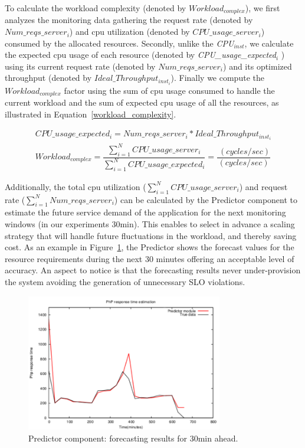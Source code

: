 To calculate the workload complexity (denoted by \emph{$Workload_{complex}$}), we first analyzes the monitoring data gathering the request rate (denoted by $Num\_reqs\_server_{i}$) and cpu utilization (denoted by \emph{$CPU\_usage\_server_{i}$}) consumed by the allocated resources. Secondly, unlike the \emph{CPU$_{inst}$},  we calculate the expected cpu usage of each resource (denoted by \emph{CPU\_usage\_expected$_{i}$} ) using its current request rate (denoted by $Num\_reqs\_server_{i}$) and its optimized throughput (denoted by $Ideal\_Throughput_{inst_{i}}$). Finally we compute the \emph{$Workload_{complex}$} factor using the sum of cpu usage consumed to handle the current workload and the sum of expected cpu usage of all the resources, as illustrated in Equation~\ref{workload_complexity}.

{\scriptsize
\begin{equation}\label{workload_complexity}
\begin{split}
CPU\_usage\_expected_{i} =  Num\_reqs\_server_{i}  * Ideal\_Throughput_{inst_{i}} \\
Workload_{complex}  = \dfrac{ \sum_{i=1}^N CPU\_usage\_server_{i}  }  {  \sum_{i=1}^N  CPU\_usage\_expected_{i}     } = \dfrac{ \ (cycles / sec) }  {  (cycles / sec ) }
\end{split}
\end{equation}
}

Additionally, the total cpu utilization ($\sum_{i=1}^N CPU\_usage\_server_{i} $) and request rate ($\sum_{i=1}^N  Num\_reqs\_server_{i}$) can be calculated by the Predictor component to estimate the future service demand of the application for the next monitoring windows (in our experiments 30min). This enables to select in advance a scaling strategy that will handle future fluctuations in the workload, and thereby saving cost. As an example in Figure~\ref{fig:forecast}, the Predictor shows the forecast values for the resource requirements during the next 30 minutes offering an acceptable level of accuracy. An aspect to notice is that the forecasting results never under-provision the system avoiding the generation of unnecessary SLO violations.

\begin{figure}[htb]
  \begin{center}
    \includegraphics[width=\linewidth,height=6cm]{images/prediction_conpaas_30min}
  \end{center}
\vspace{-5mm}
  \caption{Predictor component: forecasting results for 30min ahead.}
  \label{fig:forecast}
\end{figure}


